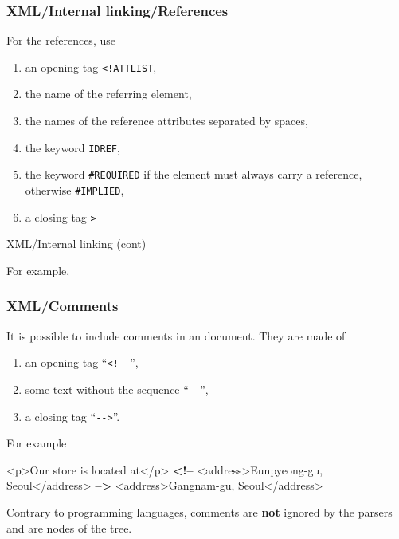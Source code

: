 %
\begin{frame}[containsverbatim]
\frametitle{XML/Internal linking/References}

For the references, use
\begin{enumerate}

  \item an opening tag \verb|<!ATTLIST|,

  \item the name of the referring element,

  \item the names of the reference attributes separated by spaces,

  \item the keyword \texttt{IDREF},

  \item the keyword \texttt{\#REQUIRED} if the element must always
    carry a reference, otherwise \texttt{\#IMPLIED},

  \item a closing tag \verb|>|

\end{enumerate}

\end{frame}

%
\begin{frame}{XML/Internal linking (cont)}
\label{xml_intro:id_idref}

For example,

\end{frame}

%
\begin{frame}[containsverbatim]
\frametitle{XML/Comments}

It is possible to include comments in an \XML document. They are made
of
\begin{enumerate}

  \item an opening tag ``\verb|<!--|'',

  \item some text without the sequence ``\verb|--|'',

  \item a closing tag ``\verb|-->|''.

\end{enumerate}
For example
{\small
\begin{semiverbatim}
<p>Our store is located at</p>
\textbf{<!--} <address>Eunpyeong-gu, Seoul</address> \textbf{-->}
<address>Gangnam-gu, Seoul</address>
\end{semiverbatim}
}
Contrary to programming languages, comments are \textbf{not} ignored
by the parsers and are nodes of the \XML tree.

\end{frame}

